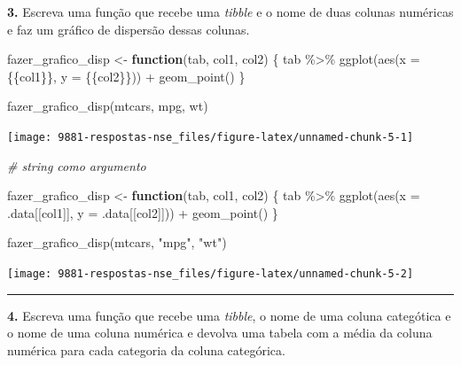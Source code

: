 \documentclass[
]{book}
\newenvironment{Shaded}{\begin{snugshade}}{\end{snugshade}}
\newcommand{\AttributeTok}[1]{\textcolor[rgb]{0.77,0.63,0.00}{#1}}
\newcommand{\CommentTok}[1]{\textcolor[rgb]{0.56,0.35,0.01}{\textit{#1}}}
\newcommand{\ControlFlowTok}[1]{\textcolor[rgb]{0.13,0.29,0.53}{\textbf{#1}}}
\newcommand{\FunctionTok}[1]{\textcolor[rgb]{0.00,0.00,0.00}{#1}}
\newcommand{\NormalTok}[1]{#1}
\newcommand{\OtherTok}[1]{\textcolor[rgb]{0.56,0.35,0.01}{#1}}
\newcommand{\SpecialCharTok}[1]{\textcolor[rgb]{0.00,0.00,0.00}{#1}}
\newcommand{\StringTok}[1]{\textcolor[rgb]{0.31,0.60,0.02}{#1}}
\begin{document}
\textbf{3.} Escreva uma função que recebe uma \emph{tibble} e o nome de duas colunas numéricas e faz um gráfico de dispersão dessas colunas.

\begin{Shaded}
\begin{Highlighting}[]
\NormalTok{fazer\_grafico\_disp }\OtherTok{\textless{}{-}} \ControlFlowTok{function}\NormalTok{(tab, col1, col2) \{}
\NormalTok{  tab }\SpecialCharTok{\%\textgreater{}\%} 
    \FunctionTok{ggplot}\NormalTok{(}\FunctionTok{aes}\NormalTok{(}\AttributeTok{x =}\NormalTok{ \{\{col1\}\}, }\AttributeTok{y =}\NormalTok{ \{\{col2\}\})) }\SpecialCharTok{+}
    \FunctionTok{geom\_point}\NormalTok{()}
\NormalTok{\}}

\FunctionTok{fazer\_grafico\_disp}\NormalTok{(mtcars, mpg, wt)}
\end{Highlighting}
\end{Shaded}

\begin{center}\texttt{[image: 9881-respostas-nse\_files/figure-latex/unnamed-chunk-5-1]} \end{center}

\begin{Shaded}
\begin{Highlighting}[]


\CommentTok{\# string como argumento}

\NormalTok{fazer\_grafico\_disp }\OtherTok{\textless{}{-}} \ControlFlowTok{function}\NormalTok{(tab, col1, col2) \{}
\NormalTok{  tab }\SpecialCharTok{\%\textgreater{}\%} 
    \FunctionTok{ggplot}\NormalTok{(}\FunctionTok{aes}\NormalTok{(}\AttributeTok{x =}\NormalTok{ .data[[col1]], }\AttributeTok{y =}\NormalTok{ .data[[col2]])) }\SpecialCharTok{+}
    \FunctionTok{geom\_point}\NormalTok{()}
\NormalTok{\}}

\FunctionTok{fazer\_grafico\_disp}\NormalTok{(mtcars, }\StringTok{"mpg"}\NormalTok{, }\StringTok{"wt"}\NormalTok{)}
\end{Highlighting}
\end{Shaded}

\begin{center}\texttt{[image: 9881-respostas-nse\_files/figure-latex/unnamed-chunk-5-2]} \end{center}

\begin{center}\rule{0.5\linewidth}{0.5pt}\end{center}

\textbf{4.} Escreva uma função que recebe uma \emph{tibble}, o nome de uma coluna categótica e o nome de uma coluna numérica e devolva uma tabela com a média da coluna numérica para cada categoria da coluna categórica.
\end{document}
